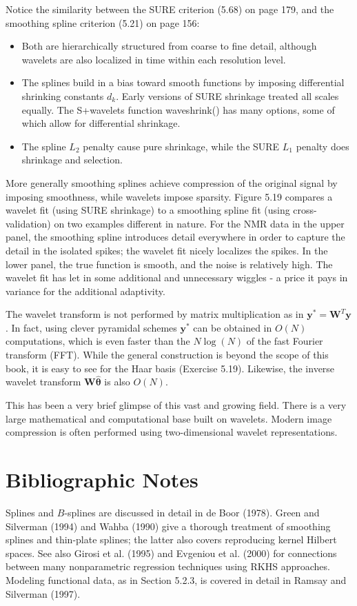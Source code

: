 \documentclass[10pt]{article}
\begin{document}
Notice the similarity between the SURE criterion (5.68) on page 179, and the smoothing spline criterion (5.21) on page 156:

\begin{itemize}
  \item Both are hierarchically structured from coarse to fine detail, although wavelets are also localized in time within each resolution level.
  \item The splines build in a bias toward smooth functions by imposing differential shrinking constants $d_{k}$. Early versions of SURE shrinkage treated all scales equally. The S+wavelets function waveshrink() has many options, some of which allow for differential shrinkage.
  \item The spline $L_{2}$ penalty cause pure shrinkage, while the SURE $L_{1}$ penalty does shrinkage and selection.
\end{itemize}

More generally smoothing splines achieve compression of the original signal by imposing smoothness, while wavelets impose sparsity. Figure 5.19 compares a wavelet fit (using SURE shrinkage) to a smoothing spline fit (using cross-validation) on two examples different in nature. For the NMR data in the upper panel, the smoothing spline introduces detail everywhere in order to capture the detail in the isolated spikes; the wavelet fit nicely localizes the spikes. In the lower panel, the true function is smooth, and the noise is relatively high. The wavelet fit has let in some additional and unnecessary wiggles - a price it pays in variance for the additional adaptivity.

The wavelet transform is not performed by matrix multiplication as in $\mathbf{y}^{*}=\mathbf{W}^{T} \mathbf{y}$. In fact, using clever pyramidal schemes $\mathbf{y}^{*}$ can be obtained in $O(N)$ computations, which is even faster than the $N \log (N)$ of the fast Fourier transform (FFT). While the general construction is beyond the scope of this book, it is easy to see for the Haar basis (Exercise 5.19). Likewise, the inverse wavelet transform $\mathbf{W} \hat{\boldsymbol{\theta}}$ is also $O(N)$.

This has been a very brief glimpse of this vast and growing field. There is a very large mathematical and computational base built on wavelets. Modern image compression is often performed using two-dimensional wavelet representations.

\section*{Bibliographic Notes}
Splines and $B$-splines are discussed in detail in de Boor (1978). Green and Silverman (1994) and Wahba (1990) give a thorough treatment of smoothing splines and thin-plate splines; the latter also covers reproducing kernel Hilbert spaces. See also Girosi et al. (1995) and Evgeniou et al. (2000) for connections between many nonparametric regression techniques using RKHS approaches. Modeling functional data, as in Section 5.2.3, is covered in detail in Ramsay and Silverman (1997).
\end{document}
